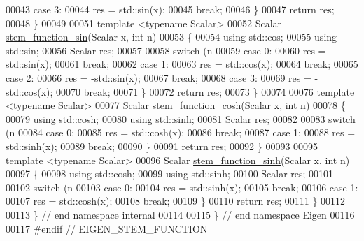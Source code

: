 \begin{DoxyCode}
00043   \textcolor{keywordflow}{case} 3:
00044     res = std::sin(x);
00045     \textcolor{keywordflow}{break};
00046   \}
00047   \textcolor{keywordflow}{return} res;
00048 \}
00049 
00051 \textcolor{keyword}{template} <\textcolor{keyword}{typename} Scalar>
00052 Scalar \hyperlink{namespace_eigen_1_1internal_a297dc38f5c9b80e2a1da7dcf2a453c90}{stem\_function\_sin}(Scalar x, \textcolor{keywordtype}{int} n)
00053 \{
00054   \textcolor{keyword}{using} std::cos;
00055   \textcolor{keyword}{using} std::sin;
00056   Scalar res;
00057 
00058   \textcolor{keywordflow}{switch} (n %
00059   \textcolor{keywordflow}{case} 0:
00060     res = std::sin(x);
00061     \textcolor{keywordflow}{break};
00062   \textcolor{keywordflow}{case} 1:
00063     res = std::cos(x);
00064     \textcolor{keywordflow}{break};
00065   \textcolor{keywordflow}{case} 2:
00066     res = -std::sin(x);
00067     \textcolor{keywordflow}{break};
00068   \textcolor{keywordflow}{case} 3:
00069     res = -std::cos(x);
00070     \textcolor{keywordflow}{break};
00071   \}
00072   \textcolor{keywordflow}{return} res;
00073 \}
00074 
00076 \textcolor{keyword}{template} <\textcolor{keyword}{typename} Scalar>
00077 Scalar \hyperlink{namespace_eigen_1_1internal_aab7949e5c95ec574eff5c4229da36846}{stem\_function\_cosh}(Scalar x, \textcolor{keywordtype}{int} n)
00078 \{
00079   \textcolor{keyword}{using} std::cosh;
00080   \textcolor{keyword}{using} std::sinh;
00081   Scalar res;
00082   
00083   \textcolor{keywordflow}{switch} (n %
00084   \textcolor{keywordflow}{case} 0:
00085     res = std::cosh(x);
00086     \textcolor{keywordflow}{break};
00087   \textcolor{keywordflow}{case} 1:
00088     res = std::sinh(x);
00089     \textcolor{keywordflow}{break};
00090   \}
00091   \textcolor{keywordflow}{return} res;
00092 \}
00093     
00095 \textcolor{keyword}{template} <\textcolor{keyword}{typename} Scalar>
00096 Scalar \hyperlink{namespace_eigen_1_1internal_ab2855d150c9eebb8ed6cb63a292dda0d}{stem\_function\_sinh}(Scalar x, \textcolor{keywordtype}{int} n)
00097 \{
00098   \textcolor{keyword}{using} std::cosh;
00099   \textcolor{keyword}{using} std::sinh;
00100   Scalar res;
00101   
00102   \textcolor{keywordflow}{switch} (n %
00103   \textcolor{keywordflow}{case} 0:
00104     res = std::sinh(x);
00105     \textcolor{keywordflow}{break};
00106   \textcolor{keywordflow}{case} 1:
00107     res = std::cosh(x);
00108     \textcolor{keywordflow}{break};
00109   \}
00110   \textcolor{keywordflow}{return} res;
00111 \}
00112 
00113 \} \textcolor{comment}{// end namespace internal}
00114 
00115 \} \textcolor{comment}{// end namespace Eigen}
00116 
00117 \textcolor{preprocessor}{#endif // EIGEN\_STEM\_FUNCTION}
\end{DoxyCode}
